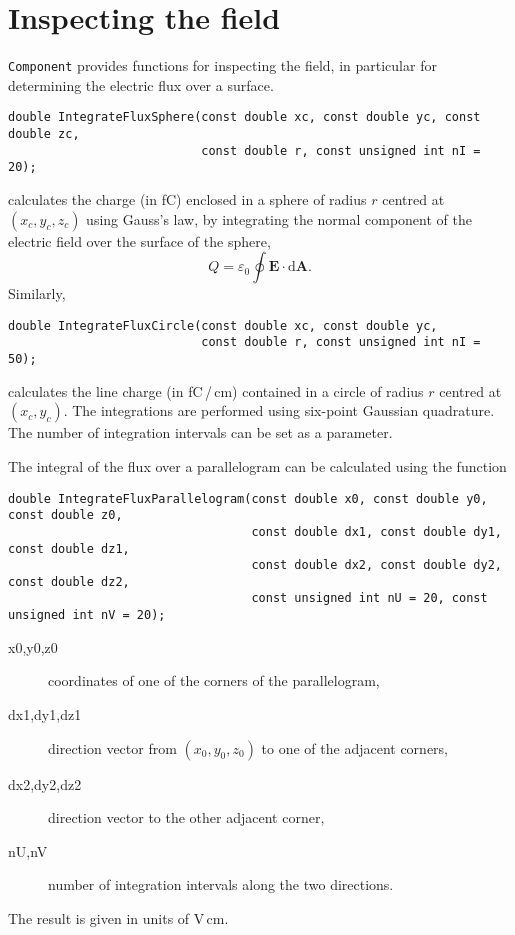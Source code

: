 \section{Inspecting the field}
\texttt{Component} provides functions for inspecting the field, 
in particular for determining the electric flux over a surface.
\begin{lstlisting}
double IntegrateFluxSphere(const double xc, const double yc, const double zc,
                           const double r, const unsigned int nI = 20);
\end{lstlisting}
calculates the charge (in fC) enclosed in a sphere of radius $r$ centred at 
$\left(x_{c}, y_{c}, z_{c}\right)$ using Gauss's law, \ie by 
integrating the normal component of the electric field over the 
surface of the sphere, 
\begin{equation*}
  Q = \varepsilon_{0} \oint \mathbf{E}\cdot \text{d}\mathbf{A}.
\end{equation*}  
Similarly,
\begin{lstlisting}
double IntegrateFluxCircle(const double xc, const double yc, 
                           const double r, const unsigned int nI = 50);
\end{lstlisting}
calculates the line charge (in fC\,/\,cm) contained in a circle of radius $r$ 
centred at $\left(x_{c}, y_{c}\right)$.  
The integrations are performed using six-point Gaussian quadrature. 
The number of integration intervals can be set as a parameter. 

The integral of the flux over a parallelogram can be calculated using 
the function
\begin{lstlisting}
double IntegrateFluxParallelogram(const double x0, const double y0, const double z0,
                                  const double dx1, const double dy1, const double dz1,
                                  const double dx2, const double dy2, const double dz2,
                                  const unsigned int nU = 20, const unsigned int nV = 20); 
\end{lstlisting}
\begin{description}
  \item[x0,y0,z0] coordinates of one of the corners of the parallelogram,
  \item[dx1,dy1,dz1] direction vector from $\left(x_{0}, y_{0}, z_{0}\right)$ 
                     to one of the adjacent corners,
  \item[dx2,dy2,dz2] direction vector to the other adjacent corner,
  \item[nU,nV] number of integration intervals along the two directions.
\end{description}
The result is given in units of V\,cm.
